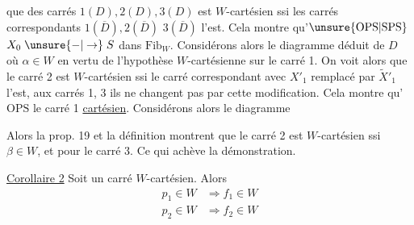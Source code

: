 que  des carrés $1(D),2(D),3(D)$ est $W$-cartésien ssi les carrés correspondants $1(\overline D),2(\overline D)$\unsure{, --|,} $3(\overline D)$ l'est. Cela montre qu'$\unsure{\mathrm{OPS}|\mathrm{SPS}}$ $X_0\mathrel{\unsure{-|\to}} S$ dans $\mathrm{Fib}_W$. Considérons alors le diagramme  déduit de $D$
où $\alpha\in W$ en vertu de l'hypothèse $W$-cartésienne sur le carré 1. On voit alors que le carré 2 est $W$-cartésien ssi le carré correspondant avec $X'_1$ remplacé par $\widetilde X'_1$ l'est,  aux carrés 1, 3 ils ne changent pas par cette modification. Cela montre qu'$\mathrm{OPS}$ le carré 1 \uline{cartésien}. Considérons alors le diagramme

Alors la prop. 19 et la définition montrent que le carré 2 est $W$-cartésien ssi $\beta\in W$, et  pour le carré 3. Ce qui achève la démonstration.

\uline{Corollaire 2} Soit
un carré $W$-cartésien.  Alors
\[
\begin{aligned}
p_1\in W&\Longrightarrow f_1\in W\\
p_2\in W&\Longrightarrow f_2\in W
\end{aligned}
\]

